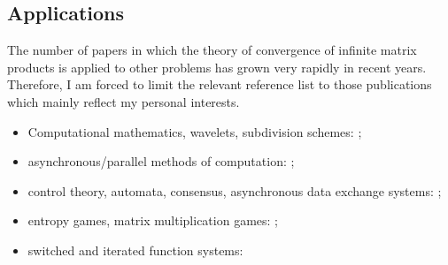 \documentclass[a4paper,fleqn]{article}
\let\cite=\citep
\begin{document}
\subsection*{Applications}
The number of papers in which the theory of convergence of infinite
matrix products is applied to other problems has grown very rapidly in
recent years. Therefore, I am forced to limit the relevant reference
list to those publications which mainly reflect my personal interests.
\begin{itemize}
  \item Computational mathematics, wavelets, subdivision schemes:
    \cite{BZh:SAIMJMAA00, CCMM:ACM21, CCS:AT04, DaubLag:SIAMMAN91,
      DaubLag:SIAMMAN92, Dumas:LAA13, GugProt:SIAMJMAA16, HStr:LASP92,
      Jia:ACM95, JLZ:JFAA01, KasBh:2000, Maesumi:TIC95, Maesumi:CMA00,
      ProtGug:PJAA15};
  \item asynchronous/parallel methods of computation: \cite{Baudet:JASSCM78,
      BEN:ETNA94, BertTsi:89, ChM:LAA69, HC:JGO19, FroSpi01,
      FromSzyld:JCAM00, LubMit:JACM86, Miellow:CRACP74, Miellow:CRACP75,
      Robert70, SBKK:LAA98, Szyld:TU98};
  \item control theory, automata, consensus, asynchronous data exchange
    systems: \cite{AKKK:92:e, AKKKP:88, Bar:CDC05, BGP:ICALP17, BGP:IC20,
      BokPar:ArXiv13, CHJ:SCL17, CHJ:SIAMJCO15, CzorJurg:Automatica08,
      CzorNaw:CCA07, CzorNiez:JFI15, Dumas:LAA13, Klep:AIT85:e, KKKK:DAN84:e,
      KKKK:AiT83:7:e, KKKK:AiT84:3:e, KKKK:AiT84:8:e, KKKK:MCS84,
      Koz:AiT90:10:e, Koz:AiT90:8:e, Koz:DAN90:311:e, Koz:AiT91:e,
      Koz:DAN91:e, Koz:BCRI03-13, KozPok:DAN92:e, Koz:ICDEA04, PGBR:IJC11,
      Shang:FM17, SBKK:CDC97, Wirth:SIAMJCO98, Wirth:MNTS02, Wirth:TR09,
      Wirth:IFACWC05};
  \item entropy games, matrix multiplication games: \cite{ACDDHK:STACS15,
      AGM:ArXiv24, AGM:MTNS24, AGMM:CDC25, GS:MCRF20};
  \item switched and iterated function systems: \cite{AGGM:Automatica22,
      AGMG2024, AhmJun14, AhmJng:NAHS16, AhmPar:CDC05, AhmJun:CDC13,
      AKKK:92:e, AKKK:MCM90, ASJ:IEEECSL17, BM:ArXiv26, BNT:LNSC04, BV:JGA12,
      CDHMS:ArXiv25, CGM:JDE15, CGP:NAHS18, CGSP:NAHS21, Cong:SCL16,
      CMS:Cham25-101, CUH:ECC2020, CzorNiez:MMAR13, Dai:JDE11, Dai:LAA12,
      Dai:JFI14, Dettmann:ArXiv25, DZ:ArXiv25, DHX:ArXiv11:2, DJM:SCL20,
      DRD:IEEETAC18, ForValt:IEEETAC12, GCM:CDC13, GLP:FCM15, GS:CDC17,
      GugProt:AIP16, HLHX:JMAA11, HSZ:IEEETAC09, JJ:CDC25, JP:CDC10,
      Jungers:IFAC24, JunMas:SIAMJCO17, KlamCzorNiez:BPASTS13,
}
\end{itemize}
\end{document}
